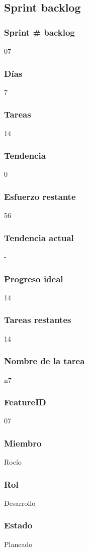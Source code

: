 \subsection{Sprint backlog}
\subsubsection{Sprint # backlog}
07
\subsubsection{Días}
7
\subsubsection{Tareas}
14
\subsubsection{Tendencia}
0
\subsubsection{Esfuerzo restante}
56
\subsubsection{Tendencia actual}
-
\subsubsection{Progreso ideal}
14
\subsubsection{Tareas restantes}
14
\subsubsection{Nombre de la tarea}
n7
\subsubsection{FeatureID}
07
\subsubsection{Miembro}
Rocío
\subsubsection{Rol}
Desarrollo
\subsubsection{Estado}
Planeado
